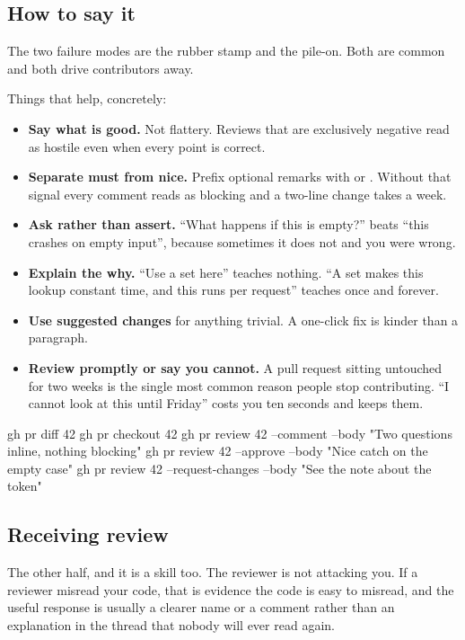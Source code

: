 \documentclass[11pt]{article}
\begin{document}
\subsection{How to say it}

\begin{trap}
The two failure modes are the rubber stamp and the pile-on. Both are common and both
drive contributors away.

Things that help, concretely:

\begin{itemize}
  \item \textbf{Say what is good.} Not flattery. Reviews that are exclusively
    negative read as hostile even when every point is correct.
  \item \textbf{Separate must from nice.} Prefix optional remarks with
     or . Without that signal every comment reads as blocking
    and a two-line change takes a week.
  \item \textbf{Ask rather than assert.} ``What happens if this is empty?'' beats
    ``this crashes on empty input'', because sometimes it does not and you were
    wrong.
  \item \textbf{Explain the why.} ``Use a set here'' teaches nothing. ``A set makes
    this lookup constant time, and this runs per request'' teaches once and forever.
  \item \textbf{Use suggested changes} for anything trivial. A one-click fix is
    kinder than a paragraph.
  \item \textbf{Review promptly or say you cannot.} A pull request sitting untouched
    for two weeks is the single most common reason people stop contributing. ``I
    cannot look at this until Friday'' costs you ten seconds and keeps them.
\end{itemize}
\end{trap}

\begin{shell}
gh pr diff 42
gh pr checkout 42
gh pr review 42 --comment --body "Two questions inline, nothing blocking"
gh pr review 42 --approve --body "Nice catch on the empty case"
gh pr review 42 --request-changes --body "See the note about the token"
\end{shell}

\subsection{Receiving review}

The other half, and it is a skill too. The reviewer is not attacking you. If a
reviewer misread your code, that is evidence the code is easy to misread, and the
useful response is usually a clearer name or a comment rather than an explanation in
the thread that nobody will ever read again.
\end{document}
